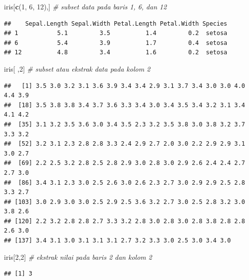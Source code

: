 \documentclass[]{article}
\newenvironment{Shaded}{\begin{snugshade}}{\end{snugshade}}
\newcommand{\CommentTok}[1]{\textcolor[rgb]{0.56,0.35,0.01}{\textit{#1}}}
\newcommand{\DecValTok}[1]{\textcolor[rgb]{0.00,0.00,0.81}{#1}}
\newcommand{\KeywordTok}[1]{\textcolor[rgb]{0.13,0.29,0.53}{\textbf{#1}}}
\newcommand{\NormalTok}[1]{#1}
\begin{document}
\begin{Shaded}
\begin{Highlighting}[]
\NormalTok{iris[}\KeywordTok{c}\NormalTok{(}\DecValTok{1}\NormalTok{, }\DecValTok{6}\NormalTok{, }\DecValTok{12}\NormalTok{),] }\CommentTok{# subset data pada baris 1, 6, dan 12}
\end{Highlighting}
\end{Shaded}

\begin{verbatim}
##    Sepal.Length Sepal.Width Petal.Length Petal.Width Species
## 1           5.1         3.5          1.4         0.2  setosa
## 6           5.4         3.9          1.7         0.4  setosa
## 12          4.8         3.4          1.6         0.2  setosa
\end{verbatim}

\begin{Shaded}
\begin{Highlighting}[]
\NormalTok{iris[ ,}\DecValTok{2}\NormalTok{] }\CommentTok{# subset atau ekstrak data pada kolom 2}
\end{Highlighting}
\end{Shaded}

\begin{verbatim}
##   [1] 3.5 3.0 3.2 3.1 3.6 3.9 3.4 3.4 2.9 3.1 3.7 3.4 3.0 3.0 4.0 4.4 3.9
##  [18] 3.5 3.8 3.8 3.4 3.7 3.6 3.3 3.4 3.0 3.4 3.5 3.4 3.2 3.1 3.4 4.1 4.2
##  [35] 3.1 3.2 3.5 3.6 3.0 3.4 3.5 2.3 3.2 3.5 3.8 3.0 3.8 3.2 3.7 3.3 3.2
##  [52] 3.2 3.1 2.3 2.8 2.8 3.3 2.4 2.9 2.7 2.0 3.0 2.2 2.9 2.9 3.1 3.0 2.7
##  [69] 2.2 2.5 3.2 2.8 2.5 2.8 2.9 3.0 2.8 3.0 2.9 2.6 2.4 2.4 2.7 2.7 3.0
##  [86] 3.4 3.1 2.3 3.0 2.5 2.6 3.0 2.6 2.3 2.7 3.0 2.9 2.9 2.5 2.8 3.3 2.7
## [103] 3.0 2.9 3.0 3.0 2.5 2.9 2.5 3.6 3.2 2.7 3.0 2.5 2.8 3.2 3.0 3.8 2.6
## [120] 2.2 3.2 2.8 2.8 2.7 3.3 3.2 2.8 3.0 2.8 3.0 2.8 3.8 2.8 2.8 2.6 3.0
## [137] 3.4 3.1 3.0 3.1 3.1 3.1 2.7 3.2 3.3 3.0 2.5 3.0 3.4 3.0
\end{verbatim}

\begin{Shaded}
\begin{Highlighting}[]
\NormalTok{iris[}\DecValTok{2}\NormalTok{,}\DecValTok{2}\NormalTok{] }\CommentTok{# ekstrak nilai pada baris 2 dan kolom 2}
\end{Highlighting}
\end{Shaded}

\begin{verbatim}
## [1] 3
\end{verbatim}
\end{document}

